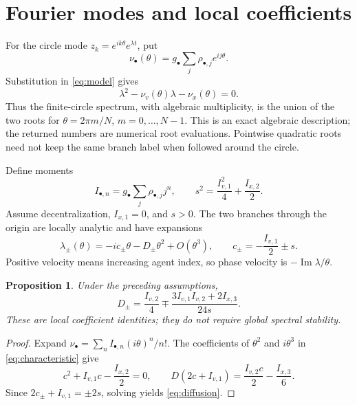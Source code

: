 \documentclass[11pt]{article}
\newtheorem{proposition}{Proposition}
\begin{document}
\section{Fourier modes and local coefficients}

For the circle mode $z_k=e^{ik\theta}e^{\lambda t}$, put
\begin{equation}\label{eq:symbol}
 \nu_\bullet(\theta)=g_\bullet\sum_j\rho_{\bullet,j}e^{ij\theta}.
\end{equation}
Substitution in \eqref{eq:model} gives
\begin{equation}\label{eq:characteristic}
 \lambda^2-\nu_v(\theta)\lambda-\nu_x(\theta)=0.
\end{equation}
Thus the finite-circle spectrum, with algebraic multiplicity, is the union
of the two roots for $\theta=2\pi m/N$, $m=0,\ldots,N-1$.
This is an exact algebraic description; the returned numbers are numerical
root evaluations. Pointwise quadratic roots need not keep the same branch
label when followed around the circle.

Define moments
\[
 I_{\bullet,n}=g_\bullet\sum_j\rho_{\bullet,j}j^n,\qquad
 s^2=\frac{I_{v,1}^2}{4}+\frac{I_{x,2}}2.
\]
Assume decentralization, $I_{x,1}=0$, and $s>0$.
The two branches through the origin are locally analytic and have expansions
\begin{equation}\label{eq:expansion}
 \lambda_\pm(\theta)=-ic_\pm\theta-D_\pm\theta^2+O(\theta^3),
 \qquad c_\pm=-\frac{I_{v,1}}2\pm s.
\end{equation}
Positive velocity means increasing agent index, so phase velocity is
$-\operatorname{Im}\lambda/\theta$.

\begin{proposition}\label{prop:coefficients}
Under the preceding assumptions,
\begin{equation}\label{eq:diffusion}
 D_\pm=\frac{I_{v,2}}4
 \mp\frac{3I_{v,1}I_{v,2}+2I_{x,3}}{24s}.
\end{equation}
These are local coefficient identities; they do not require global
spectral stability.
\end{proposition}
\begin{proof}
Expand $\nu_\bullet=\sum_n I_{\bullet,n}(i\theta)^n/n!$.
The coefficients of $\theta^2$ and $i\theta^3$ in
\eqref{eq:characteristic} give
\[
 c^2+I_{v,1}c-\frac{I_{x,2}}2=0,\qquad
 D(2c+I_{v,1})=\frac{I_{v,2}c}{2}-\frac{I_{x,3}}6.
\]
Since $2c_\pm+I_{v,1}=\pm2s$, solving yields \eqref{eq:diffusion}.
\end{proof}
\end{document}
